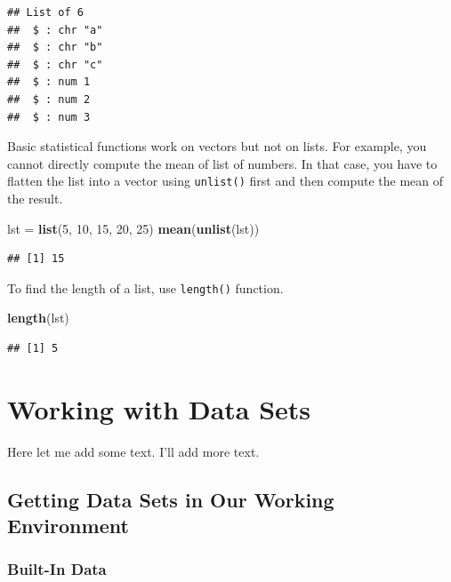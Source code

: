 \documentclass[
]{book}
\newenvironment{Shaded}{\begin{snugshade}}{\end{snugshade}}
\newcommand{\DecValTok}[1]{\textcolor[rgb]{0.00,0.00,0.81}{#1}}
\newcommand{\KeywordTok}[1]{\textcolor[rgb]{0.13,0.29,0.53}{\textbf{#1}}}
\newcommand{\NormalTok}[1]{#1}
\newcommand{\StringTok}[1]{\textcolor[rgb]{0.31,0.60,0.02}{#1}}
\begin{document}
\begin{verbatim}
## List of 6
##  $ : chr "a"
##  $ : chr "b"
##  $ : chr "c"
##  $ : num 1
##  $ : num 2
##  $ : num 3
\end{verbatim}

Basic statistical functions work on vectors but not on lists. For example, you cannot directly compute the mean of list of numbers. In that case, you have to flatten the list into a vector using \texttt{unlist()} first and then compute the mean of the result.

\begin{Shaded}
\begin{Highlighting}[]
\NormalTok{lst =}\StringTok{ }\KeywordTok{list}\NormalTok{(}\DecValTok{5}\NormalTok{, }\DecValTok{10}\NormalTok{, }\DecValTok{15}\NormalTok{, }\DecValTok{20}\NormalTok{, }\DecValTok{25}\NormalTok{)}
\KeywordTok{mean}\NormalTok{(}\KeywordTok{unlist}\NormalTok{(lst))}
\end{Highlighting}
\end{Shaded}

\begin{verbatim}
## [1] 15
\end{verbatim}

To find the length of a list, use \texttt{length()} function.

\begin{Shaded}
\begin{Highlighting}[]
\KeywordTok{length}\NormalTok{(lst)}
\end{Highlighting}
\end{Shaded}

\begin{verbatim}
## [1] 5
\end{verbatim}

\hypertarget{working-with-data-sets}{%
\chapter{Working with Data Sets}\label{working-with-data-sets}}

Here let me add some text. I'll add more text.

\hypertarget{getting-data-sets-in-our-working-environment}{%
\section{Getting Data Sets in Our Working Environment}\label{getting-data-sets-in-our-working-environment}}

\hypertarget{built-in-data}{%
\subsection*{Built-In Data}\label{built-in-data}}
\end{document}
